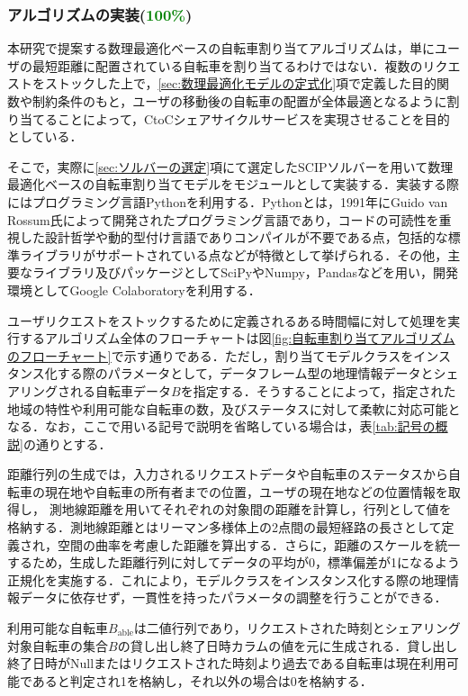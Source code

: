       \subsubsection{アルゴリズムの実装(\textcolor{green}{100\%})}
        \label{sec:アルゴリズムの実装}
          \par 本研究で提案する数理最適化ベースの自転車割り当てアルゴリズムは，単にユーザの最短距離に配置されている自転車を割り当てるわけではない．複数のリクエストをストックした上で，\ref{sec:数理最適化モデルの定式化}項で定義した目的関数や制約条件のもと，ユーザの移動後の自転車の配置が全体最適となるように割り当てることによって，CtoCシェアサイクルサービスを実現させることを目的としている．
          \par そこで，実際に\ref{sec:ソルバーの選定}項にて選定したSCIPソルバーを用いて数理最適化ベースの自転車割り当てモデルをモジュールとして実装する．実装する際にはプログラミング言語Pythonを利用する．Pythonとは，1991年にGuido van Rossum氏によって開発されたプログラミング言語であり，コードの可読性を重視した設計哲学や動的型付け言語でありコンパイルが不要である点，包括的な標準ライブラリがサポートされている点などが特徴として挙げられる．その他，主要なライブラリ及びパッケージとしてSciPyやNumpy，Pandasなどを用い，開発環境としてGoogle Colaboratoryを利用する．
          \par ユーザリクエストをストックするために定義されるある時間幅に対して処理を実行するアルゴリズム全体のフローチャートは図\ref{fig:自転車割り当てアルゴリズムのフローチャート}で示す通りである．ただし，割り当てモデルクラスをインスタンス化する際のパラメータとして，データフレーム型の地理情報データとシェアリングされる自転車データ$B$を指定する．そうすることによって，指定された地域の特性や利用可能な自転車の数，及びステータスに対して柔軟に対応可能となる．なお，ここで用いる記号で説明を省略している場合は，表\ref{tab:記号の概説}の通りとする．
          \par 距離行列の生成では，入力されるリクエストデータや自転車のステータスから自転車の現在地や自転車の所有者までの位置，ユーザの現在地などの位置情報を取得し， 測地線距離を用いてそれぞれの対象間の距離を計算し，行列として値を格納する．測地線距離とはリーマン多様体上の2点間の最短経路の長さとして定義され，空間の曲率を考慮した距離を算出する．さらに，距離のスケールを統一するため，生成した距離行列に対してデータの平均が0，標準偏差が1になるよう正規化を実施する．これにより，モデルクラスをインスタンス化する際の地理情報データに依存せず，一貫性を持ったパラメータの調整を行うことができる．
          \par 利用可能な自転車$B_{\text{able}}$は二値行列であり，リクエストされた時刻とシェアリング対象自転車の集合$B$の貸し出し終了日時カラムの値を元に生成される．貸し出し終了日時がNullまたはリクエストされた時刻より過去である自転車は現在利用可能であると判定され1を格納し，それ以外の場合は0を格納する．
